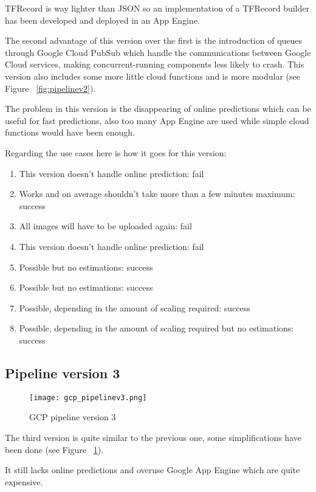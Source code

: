 TFRecord is way lighter than JSON so an implementation of a TFRecord builder has been developed and deployed in an App Engine.

The second advantage of this version over the first is the introduction of queues through Google Cloud PubSub which handle the communications between Google Cloud services, making concurrent-running components less likely to crash.
This version also includes some more little cloud functions and is more modular (see Figure ~\ref{fig:pipelinev2}).

The problem in this version is the disappearing of online predictions which can be useful for fast predictions, also too many App Engine are used while simple cloud functions would have been enough.

Regarding the use cases here is how it goes for this version:
\begin{enumerate}
    \item This version doesn't handle online prediction: fail
    \item Works and on average shouldn't take more than a few minutes maximum: success
    \item All images will have to be uploaded again: fail
    \item This version doesn't handle online prediction: fail
    \item Possible but no estimations: success
    \item Possible but no estimations: success
    \item Possible, depending in the amount of scaling required: success
    \item Possible, depending in the amount of scaling required but no estimations: success
\end{enumerate}
\pagebreak\subsection{Pipeline version 3}
\begin{figure}[H]
    \centering
    \texttt{[image: gcp\_pipelinev3.png]}
	\caption{GCP pipeline version 3}
	\label{fig:pipelinev3}
\end{figure}

The third version is quite similar to the previous one, some simplifications have been done (see Figure ~\ref{fig:pipelinev3}).

It still lacks online predictions and overuse Google App Engine which are quite expensive.

